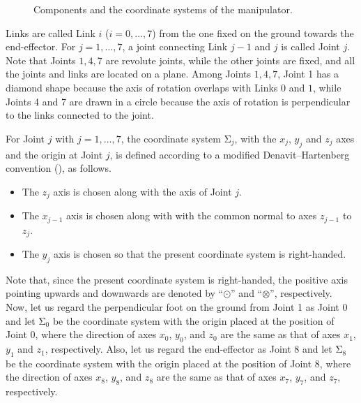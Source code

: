 \documentclass{birkjour}
\theoremstyle{plain}
\theoremstyle{definition}
\newcommand{\rmSigma}{\mathrm{\Sigma}}
\begin{document}
\begin{figure}
        \caption{Components and the coordinate systems of the manipulator.}
        \label{fig:ev3-components}
    \end{figure}
    Links 
    are called Link $i$ ($i=0,\dots,7$) from the one fixed on the ground 
    towards the end-effector.
    For $j=1,\dots,7$,
    a joint connecting Link $j-1$ and $j$ is 
    called Joint $j$. Note that Joints $1,4,7$ are revolute joints, while the other 
    joints are fixed, and all the joints and links are located on a plane.
    Among Joints $1,4,7$, Joint 1 has a diamond shape because the axis of rotation
    overlaps with Links $0$ and $1$, while Joints 4 and 7 are drawn in a circle
    because the axis of rotation is perpendicular to the links connected to the joint.

    For Joint $j$ with $j=1,\dots,7$, the coordinate system $\rmSigma_j$, with the $x_j$, $y_j$
    and $z_j$ axes and the origin at Joint $j$, is defined according to 
    a modified Denavit–Hartenberg convention \cite{wal-sch2008}
    (), as follows.
    \begin{itemize}
        \item The $z_j$ axis is chosen along with the axis of Joint $j$.
        \item The $x_{j-1}$ axis is chosen along with with the common normal to axes $z_{j-1}$ to
        $z_j$.
        \item The $y_j$ axis is chosen so that the present coordinate system is right-handed.
    \end{itemize}
    Note that, since the present coordinate system is right-handed, the positive axis pointing upwards and downwards are denoted by ``$\odot$'' and ``$\otimes$'', respectively.
    Now,
    let us regard the perpendicular foot on the ground from Joint 1 as Joint 0 and 
    let $\rmSigma_0$ be the coordinate system with the origin placed at the position of Joint 0,
    where the direction of axes $x_0$, $y_0$, and $z_0$ are the same as that of 
    axes $x_1$, $y_1$ and $z_1$, respectively. 
    Also, let us regard the end-effector as Joint 8 and let $\rmSigma_8$ be the coordinate system with the origin placed at the position of Joint 8,
    where the direction of axes $x_8$, $y_8$, and $z_8$ are the same as that of 
    axes $x_7$, $y_7$, and $z_7$, respectively.
\end{document}
